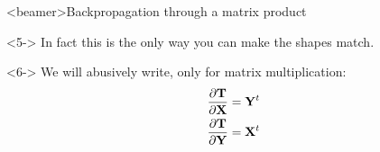 \documentclass[xcolor=pdftex,dvipsnames,table,mathserif]{beamer}
\begin{document}
\begin{frame}<beamer>{Backpropagation through a matrix product}

  \centering

\begin{alertblock}<5->{}
  In fact this is the only way you can make the shapes match.
\end{alertblock}

  \begin{block}<6->{}
    We will abusively write, \alert{only for matrix multiplication}:
    \begin{align*}
    \pdv{\mathbf{T}}{\mathbf{X}} &= \mathbf{Y}^t \\
    \pdv{\mathbf{T}}{\mathbf{Y}} &= \mathbf{X}^t
    \end{align*}
  \end{block}

\end{frame}
\end{document}
